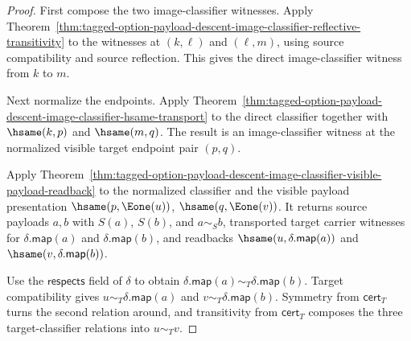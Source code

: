\begin{proof}
First compose the two image-classifier witnesses. Apply
Theorem~\ref{thm:tagged-option-payload-descent-image-classifier-reflective-transitivity}
to the witnesses at $(k,\ell)$ and $(\ell,m)$, using source compatibility and
source reflection. This gives the direct image-classifier witness from $k$ to
$m$.

Next normalize the endpoints. Apply
Theorem~\ref{thm:tagged-option-payload-descent-image-classifier-hsame-transport}
to the direct classifier together with $\hsame(k,p)$ and $\hsame(m,q)$. The
result is an image-classifier witness at the normalized visible target endpoint
pair $(p,q)$.

Apply
Theorem~\ref{thm:tagged-option-payload-descent-image-classifier-visible-payload-readback}
to the normalized classifier and the visible payload presentation
$\hsame(p,\Eone(u))$, $\hsame(q,\Eone(v))$. It returns source payloads $a,b$
with $S(a)$, $S(b)$, and $a\sim_S b$, transported target carrier witnesses for
$\delta.\mathsf{map}(a)$ and $\delta.\mathsf{map}(b)$, and readbacks
$\hsame(u,\delta.\mathsf{map}(a))$ and
$\hsame(v,\delta.\mathsf{map}(b))$.

Use the $\mathsf{respects}$ field of $\delta$ to obtain
$\delta.\mathsf{map}(a)\sim_T\delta.\mathsf{map}(b)$. Target compatibility gives
$u\sim_T\delta.\mathsf{map}(a)$ and
$v\sim_T\delta.\mathsf{map}(b)$. Symmetry from $\mathsf{cert}_T$ turns the
second relation around, and transitivity from $\mathsf{cert}_T$ composes the
three target-classifier relations into $u\sim_T v$.
\end{proof}

